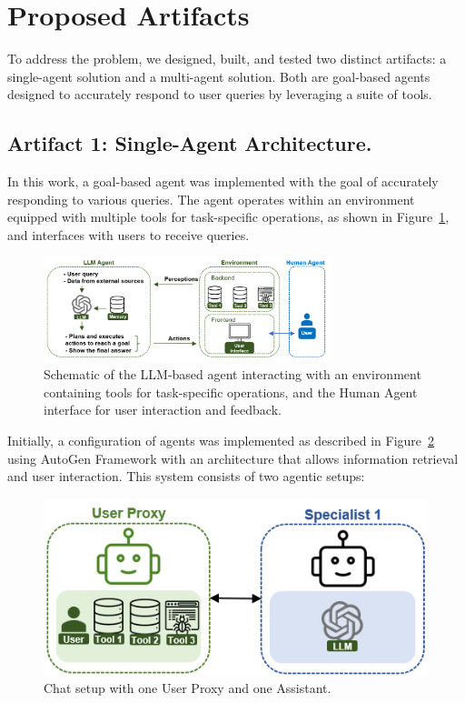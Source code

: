     \section{Proposed Artifacts}

            To address the problem, we designed, built, and tested two distinct artifacts: a single-agent solution and a multi-agent solution. Both are goal-based agents designed to accurately respond to user queries by leveraging a suite of tools.

        \subsection{Artifact 1: Single-Agent Architecture.}

            In this work, a goal-based agent \citep{Russell2020} was implemented with the goal of accurately responding to various queries. 
            The agent operates within an environment equipped with multiple tools for task-specific operations, as shown in Figure~\ref{fig:agent_environment}, and interfaces with users to receive queries.
            
            \begin{figure}[h]
                \centering
                \includegraphics[width=0.75\textwidth]{images/agent_environment_4.png}
                \caption{Schematic of the LLM-based agent interacting with an environment containing tools for task-specific operations, and the Human Agent interface for user interaction and feedback.}
                \label{fig:agent_environment}
            \end{figure}           
            
            Initially, a configuration of agents was implemented as described in Figure~\ref{fig:agent_config_1} using AutoGen Framework \citep{Wu2023} with an architecture that allows information retrieval and user interaction. This system consists of two agentic setups:

            \begin{figure}[h]
                \centering
                \includegraphics[width=.5\textwidth]{images/agent_config_1.png}
                \caption{Chat setup with one User Proxy \citep{Wu2023} and one Assistant.}
                \label{fig:agent_config_1}
            \end{figure}

